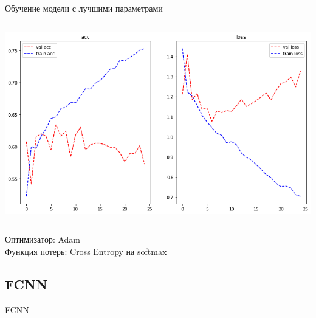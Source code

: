 \documentclass[c, aspectratio = 43]{beamer}
\begin{document}
        \begin{frame}
        	Обучение модели с лучшими параметрами
        	\begin{columns}
        	\includegraphics[width=\linewidth]{rnn_train.png}
        	\begin{table}[]
        	\end{table}
        \end{columns}
    Оптимизатор: Adam\\
    Функция потерь: Cross Entropy на softmax 
        \end{frame}
        
            
 \subsection{FCNN}          
            \begin{frame}{FCNN}
            
            
            \end{frame}
\end{document}
